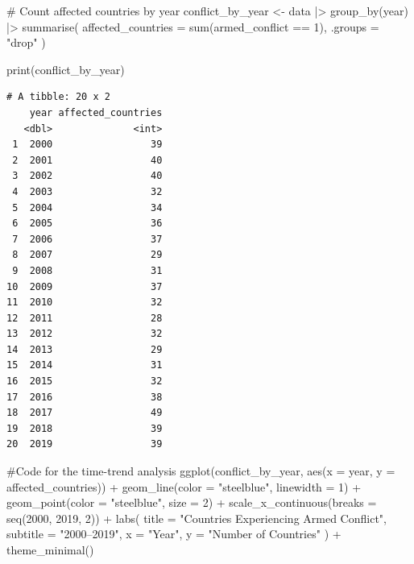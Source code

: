 \documentclass[
  letterpaper,
  DIV=11,
  numbers=noendperiod]{scrartcl}
\newenvironment{Shaded}{\begin{snugshade}}{\end{snugshade}}
\newcommand{\AttributeTok}[1]{\textcolor[rgb]{0.40,0.45,0.13}{#1}}
\newcommand{\CommentTok}[1]{\textcolor[rgb]{0.37,0.37,0.37}{#1}}
\newcommand{\DecValTok}[1]{\textcolor[rgb]{0.68,0.00,0.00}{#1}}
\newcommand{\FunctionTok}[1]{\textcolor[rgb]{0.28,0.35,0.67}{#1}}
\newcommand{\NormalTok}[1]{\textcolor[rgb]{0.00,0.23,0.31}{#1}}
\newcommand{\OtherTok}[1]{\textcolor[rgb]{0.00,0.23,0.31}{#1}}
\newcommand{\SpecialCharTok}[1]{\textcolor[rgb]{0.37,0.37,0.37}{#1}}
\newcommand{\StringTok}[1]{\textcolor[rgb]{0.13,0.47,0.30}{#1}}
\begin{document}
\begin{Shaded}
\begin{Highlighting}[]
\CommentTok{\# Count affected countries by year}
\NormalTok{conflict\_by\_year }\OtherTok{\textless{}{-}}\NormalTok{ data }\SpecialCharTok{|\textgreater{}}
  \FunctionTok{group\_by}\NormalTok{(year) }\SpecialCharTok{|\textgreater{}}
  \FunctionTok{summarise}\NormalTok{(}
    \AttributeTok{affected\_countries =} \FunctionTok{sum}\NormalTok{(armed\_conflict }\SpecialCharTok{==} \DecValTok{1}\NormalTok{),}
    \AttributeTok{.groups =} \StringTok{"drop"}
\NormalTok{  )}

\FunctionTok{print}\NormalTok{(conflict\_by\_year)}
\end{Highlighting}
\end{Shaded}

\begin{verbatim}
# A tibble: 20 x 2
    year affected_countries
   <dbl>              <int>
 1  2000                 39
 2  2001                 40
 3  2002                 40
 4  2003                 32
 5  2004                 34
 6  2005                 36
 7  2006                 37
 8  2007                 29
 9  2008                 31
10  2009                 37
11  2010                 32
12  2011                 28
13  2012                 32
14  2013                 29
15  2014                 31
16  2015                 32
17  2016                 38
18  2017                 49
19  2018                 39
20  2019                 39
\end{verbatim}

\begin{Shaded}
\begin{Highlighting}[]
\CommentTok{\#Code for the time{-}trend analysis}
\FunctionTok{ggplot}\NormalTok{(conflict\_by\_year,}
       \FunctionTok{aes}\NormalTok{(}\AttributeTok{x =}\NormalTok{ year, }\AttributeTok{y =}\NormalTok{ affected\_countries)) }\SpecialCharTok{+}
  \FunctionTok{geom\_line}\NormalTok{(}\AttributeTok{color =} \StringTok{"steelblue"}\NormalTok{, }\AttributeTok{linewidth =} \DecValTok{1}\NormalTok{) }\SpecialCharTok{+}
  \FunctionTok{geom\_point}\NormalTok{(}\AttributeTok{color =} \StringTok{"steelblue"}\NormalTok{, }\AttributeTok{size =} \DecValTok{2}\NormalTok{) }\SpecialCharTok{+}
  \FunctionTok{scale\_x\_continuous}\NormalTok{(}\AttributeTok{breaks =} \FunctionTok{seq}\NormalTok{(}\DecValTok{2000}\NormalTok{, }\DecValTok{2019}\NormalTok{, }\DecValTok{2}\NormalTok{)) }\SpecialCharTok{+}
  \FunctionTok{labs}\NormalTok{(}
    \AttributeTok{title =} \StringTok{"Countries Experiencing Armed Conflict"}\NormalTok{,}
    \AttributeTok{subtitle =} \StringTok{"2000–2019"}\NormalTok{,}
    \AttributeTok{x =} \StringTok{"Year"}\NormalTok{,}
    \AttributeTok{y =} \StringTok{"Number of Countries"}
\NormalTok{  ) }\SpecialCharTok{+}
  \FunctionTok{theme\_minimal}\NormalTok{()}
\end{Highlighting}
\end{Shaded}
\end{document}
